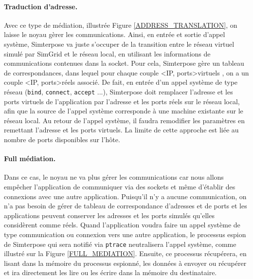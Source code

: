 \paragraph{Traduction d'adresse.}
 Avec ce type de médiation, illustrée Figure \ref{ADDRESS_TRANSLATION}, on laisse le noyau gèrer les communications. Ainsi, en entrée et sortie d'appel système, Simterpose va juste s'occuper de la transition entre le réseau virtuel simulé
 par SimGrid et le réseau local, en utilisant les informations de communications
 contenues dans la socket. Pour cela, Simterpose gère un tableau de
 correspondances, dans lequel pour chaque couple <IP, ports>virtuels , on a un
 couple <IP, ports>réels associé.  De fait, en entrée d'un appel système de
 type réseau (\texttt{bind}, \texttt{connect}, \texttt{accept} ...), Simterpose
 doit remplacer l'adresse et les ports virtuels de l'application par l'adresse
 et les ports réels sur le réseau local, afin que la source de l'appel système
 corresponde à une machine existante sur le réseau local. Au retour de l'appel
 système, il faudra remodifier les paramètres en remettant l'adresse et les
 ports virtuels. La limite de cette approche est liée au nombre de
 ports disponibles sur l'hôte.

\paragraph{Full médiation.} \label{paragraph:FULL_MEDIATION}
Dans ce cas, le noyau ne va plus gérer les communications car nous allons
empêcher l'application de communiquer via des sockets et même d'établir des
connexions avec une autre application. Puisqu'il n'y a aucune communication, on
n'a pas besoin de gérer de tableau de correspondance d'adresses et de ports et
les applications peuvent conserver les adresses et les ports simulés qu'elles
considèrent comme réels. Quand l'application voudra faire un appel système de
type communication ou connexion vers une autre application, le processus espion
de Simterpose qui sera notifié via \texttt{ptrace} neutralisera l'appel système,
comme illustré sur la Figure \ref{FULL_MEDIATION}. Ensuite, ce processus
récupérera, en lisant dans la mémoire du processus espionné, les données à
envoyer ou récupérer et ira directement les lire ou les écrire dans la mémoire
du destinataire.

